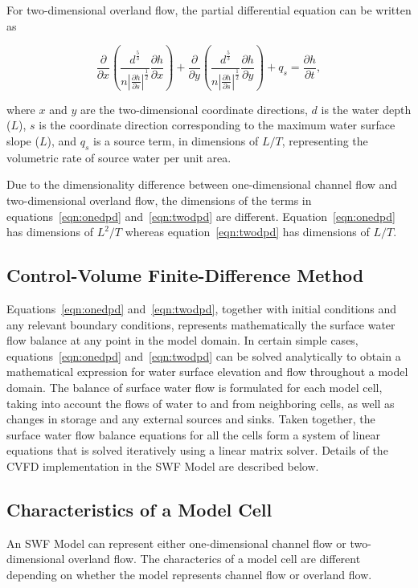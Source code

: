 \documentclass[fleqn]{article}
\begin{document}
For two-dimensional overland flow, the partial differential equation can be written as

\begin{equation}
  \frac{\partial}{\partial x}
  \left (
  \frac{d^{\frac{5}{3}}}{n \left | \frac{\partial h}{\partial s} \right |^{\frac{1}{2}} } \frac{\partial h}{\partial x}
  \right )
  + \frac{\partial}{\partial y}
  \left (
  \frac{d^{\frac{5}{3}}}{n \left | \frac{\partial h}{\partial s} \right |^{\frac{1}{2}} } \frac{\partial h}{\partial y}
  \right )
  + q_s
  = \frac{\partial h}{\partial t},
  \label{eqn:twodpd}
\end{equation}

\noindent where $x$ and $y$ are the two-dimensional coordinate directions, $d$ is the water depth ($L$), $s$ is the coordinate direction corresponding to the maximum water surface slope ($L$), and $q_s$ is a source term, in dimensions of $L/T$, representing the volumetric rate of source water per unit area.

Due to the dimensionality difference between one-dimensional channel flow and two-dimensional overland flow, the dimensions of the terms in equations~\ref{eqn:onedpd} and~\ref{eqn:twodpd} are different.  Equation~\ref{eqn:onedpd} has dimensions of $L^2/T$ whereas equation~\ref{eqn:twodpd} has dimensions of $L/T$.

\subsection{Control-Volume Finite-Difference Method}
Equations~\ref{eqn:onedpd} and~\ref{eqn:twodpd}, together with initial conditions and any relevant boundary conditions, represents mathematically the surface water flow balance at any point in the model domain. In certain simple cases, equations~\ref{eqn:onedpd} and~\ref{eqn:twodpd} can be solved analytically to obtain a mathematical expression for water surface elevation and flow throughout a model domain. The balance of surface water flow is formulated for each model cell, taking into account the flows of water to and from neighboring cells, as well as changes in storage and any external sources and sinks.  Taken together, the surface water flow balance equations for all the cells form a system of linear equations that is solved iteratively using a linear matrix solver. Details of the CVFD implementation in the SWF Model are described below.

\subsection{Characteristics of a Model Cell}
An SWF Model can represent either one-dimensional channel flow or two-dimensional overland flow.  The characterics of a model cell are different depending on whether the model represents channel flow or overland flow.
\end{document}
